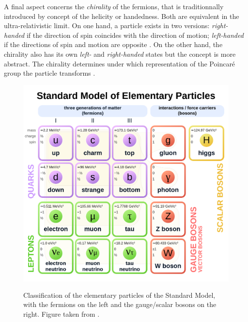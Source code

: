 A final aspect concerns the \textit{chirality} of the fermions, that is traditionnally introduced by concept of the helicity or handedness. Both are equivalent in the ultra-relativistic limit. On one hand, a particle exists in two versions: \textit{right-handed} if the direction of spin coincides with the direction of motion; \textit{left-handed} if the directions of spin and motion are opposite \cite{thomsonModernParticlePhysics2013}. On the other hand, the chirality also has its own \textit{left-} and \textit{right-handed} states but the concept is more abstract. The chirality determines under which representation of the Poincaré group the particle transforms \cite{QuantumDiaries}.\\

\begin{figure}[h]
	\centering
	\includegraphics[width=\textwidth]{Figs/Chapter2/Standard_Model_of_Elementary_Particles.svg.png}\label{fig:StdModel}
	\caption{Classification of the elementary particles of the Standard Model, with the fermions on the left and the gauge/scalar bosons on the right. Figure taken from \cite{missmjStandardModelElementary2019}.}
	\label{fig:StdModel}
\end{figure}

